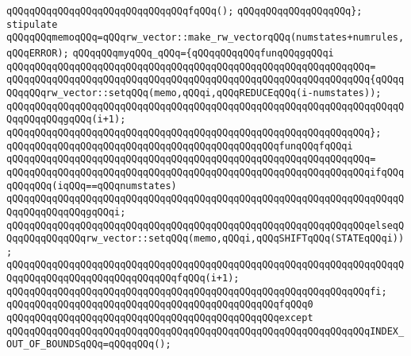 \verb|qQQqqQQqqQQqqQQqqQQqqQQqqQQqqQQqfqQQq();|\newline
\verb|qQQqqQQqqQQqqQQqqQQq};|\newline
\newline
\verb|stipulate|\newline
\verb|qQQqqQQqmemoqQQq=qQQqrw_vector::make_rw_vectorqQQq(numstates+numrules,qQQqERROR);|\newline
\verb|qQQqqQQqmyqQQq_qQQq={qQQqqQQqqQQqfunqQQqgqQQqi|\newline
\verb|qQQqqQQqqQQqqQQqqQQqqQQqqQQqqQQqqQQqqQQqqQQqqQQqqQQqqQQqqQQqqQQq=|\newline
\verb|qQQqqQQqqQQqqQQqqQQqqQQqqQQqqQQqqQQqqQQqqQQqqQQqqQQqqQQqqQQqqQQq{qQQqqQQqqQQqrw_vector::setqQQq(memo,qQQqi,qQQqREDUCEqQQq(i-numstates));|\newline
\verb|qQQqqQQqqQQqqQQqqQQqqQQqqQQqqQQqqQQqqQQqqQQqqQQqqQQqqQQqqQQqqQQqqQQqqQQqqQQqqQQqgqQQq(i+1);|\newline
\verb|qQQqqQQqqQQqqQQqqQQqqQQqqQQqqQQqqQQqqQQqqQQqqQQqqQQqqQQqqQQqqQQq};|\newline
\newline
\verb|qQQqqQQqqQQqqQQqqQQqqQQqqQQqqQQqqQQqqQQqqQQqqQQqfunqQQqfqQQqi|\newline
\verb|qQQqqQQqqQQqqQQqqQQqqQQqqQQqqQQqqQQqqQQqqQQqqQQqqQQqqQQqqQQqqQQq=|\newline
\verb|qQQqqQQqqQQqqQQqqQQqqQQqqQQqqQQqqQQqqQQqqQQqqQQqqQQqqQQqqQQqqQQqifqQQqqQQqqQQq(iqQQq==qQQqnumstates)|\newline
\verb|qQQqqQQqqQQqqQQqqQQqqQQqqQQqqQQqqQQqqQQqqQQqqQQqqQQqqQQqqQQqqQQqqQQqqQQqqQQqqQQqqQQqgqQQqi;|\newline
\verb|qQQqqQQqqQQqqQQqqQQqqQQqqQQqqQQqqQQqqQQqqQQqqQQqqQQqqQQqqQQqqQQqelseqQQqqQQqqQQqqQQqrw_vector::setqQQq(memo,qQQqi,qQQqSHIFTqQQq(STATEqQQqi));|\newline
\verb|qQQqqQQqqQQqqQQqqQQqqQQqqQQqqQQqqQQqqQQqqQQqqQQqqQQqqQQqqQQqqQQqqQQqqQQqqQQqqQQqqQQqqQQqqQQqqQQqqQQqfqQQq(i+1);|\newline
\verb|qQQqqQQqqQQqqQQqqQQqqQQqqQQqqQQqqQQqqQQqqQQqqQQqqQQqqQQqqQQqqQQqfi;|\newline
\newline
\verb|qQQqqQQqqQQqqQQqqQQqqQQqqQQqqQQqqQQqqQQqqQQqqQQqfqQQq0|\newline
\verb|qQQqqQQqqQQqqQQqqQQqqQQqqQQqqQQqqQQqqQQqqQQqqQQqexcept|\newline
\verb|qQQqqQQqqQQqqQQqqQQqqQQqqQQqqQQqqQQqqQQqqQQqqQQqqQQqqQQqqQQqqQQqINDEX_OUT_OF_BOUNDSqQQq=qQQqqQQq();|\newline
